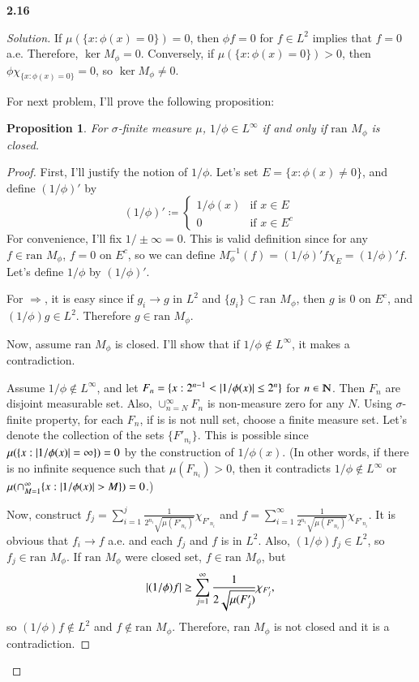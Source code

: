 \documentclass[a4paper, 12pt]{article}
\newcommand{\ran}{\textrm{ran }}
\theoremstyle{Mydefinition}
\theoremstyle{Mytheorem}
\newtheorem{proposition}[statement]{Proposition}
\begin{document}
\noindent \textbf{2.16}

\begin{proof}[Solution]
If $\mu\left(\{x:\phi(x)=0\}\right) = 0$, then $\phi f = 0$ for $f\in L^2$ implies that $f = 0$ a.e. Therefore, $\ker M_{\phi}=0$. Conversely, if $\mu\left(\{x:\phi(x)=0\}\right) >0$, then $\phi \chi_{\{x:\phi(x)=0\}} = 0$, so $\ker M_{\phi}\neq 0$.

For next problem, I'll prove the following proposition:
\begin{proposition}
For $\sigma$-finite measure $\mu$, $1/\phi \in L^\infty$ if and only if $\ran M_{\phi}$ is closed.
\end{proposition}
\begin{proof}
First, I'll justify the notion of $1/\phi$. Let's set $E=\{x:\phi(x)\neq 0\}$, and define $(1/\phi)'$ by 
\begin{equation}
    (1/\phi)' \coloneqq\begin{cases}
    1/\phi(x) & \textrm{if }x\in E\\
    0 & \textrm{if }x\in E^c
    \end{cases}
\end{equation}
For convenience, I'll fix $1/\pm \infty = 0$. This is valid definition since for any $f\in \ran M_{\phi}$, $f = 0$ on $E^c$, so we can define $M^{-1}_{\phi}(f) = (1/\phi)'f\chi_{E} = (1/\phi)'f$. Let's define $1/\phi$ by $(1/\phi)'$.

For $\Rightarrow$, it is easy since if $g_i\rightarrow g$ in $L^2$ and $\{g_i\}\subset \ran M_{\phi}$, then $g$ is $0$ on $E^c$, and $(1/\phi)g\in L^2$. Therefore $g\in \ran M_{\phi}$.

Now, assume $\ran M_{\phi}$ is closed. I'll show that if $1/\phi \notin L^\infty$, it makes a contradiction.

Assume $1/\phi \notin L^\infty$, and let $F_n = \{x:2^{n-1}< \abs{1/\phi(x)}\leq 2^n\}$ for $n\in \varmathbb{N}$. Then $F_n$ are disjoint measurable set. Also, $\cup_{n=N}^\infty F_n$ is non-measure zero for any $N$. Using $\sigma$-finite property, for each $F_n$, if is is not null set, choose a finite measure set. Let's denote the collection of the sets $\{F'_{n_i}\}$. This is possible since $\mu(\{x:\abs{1/\phi(x)}=\infty\}) = 0$ by the construction of $1/\phi(x)$. (In other words, if there is no infinite sequence such that $\mu(F_{n_i})>0$, then it contradicts $1/\phi\notin L^\infty$ or $\mu(\cap_{M=1}^\infty \{x:\abs{1/\phi(x)}>M\}) = 0$.)

Now, construct $f_j = \sum_{i=1}^j \frac{1}{2^{n_i} \sqrt{\mu(F'_{n_i})}}\chi_{F'_{n_i}}$ and $f = \sum_{i=1}^\infty \frac{1}{2^{n_i} \sqrt{\mu(F'_{n_i})}}\chi_{F'_{n_i}}$. It is obvious that $f_i\rightarrow f$ a.e. and each $f_j$ and $f$ is in $L^2$.
Also, $(1/\phi) f_j \in L^2$, so $f_j\in \ran M_{\phi}$. If $\ran M_{\phi}$ were closed set, $f\in \ran M_{\phi}$, but
\begin{equation}
    \abs{(1/\phi) f} \geq\sum_{j=1}^\infty \frac{1}{2\sqrt{\mu(F'_j)}}\chi_{F'_j},
\end{equation}
so $(1/\phi) f\notin L^2$ and $f\notin \ran M_{\phi}$. Therefore, $\ran M_{\phi}$ is not closed and it is a contradiction.
\end{proof}
\end{proof}
\end{document}

